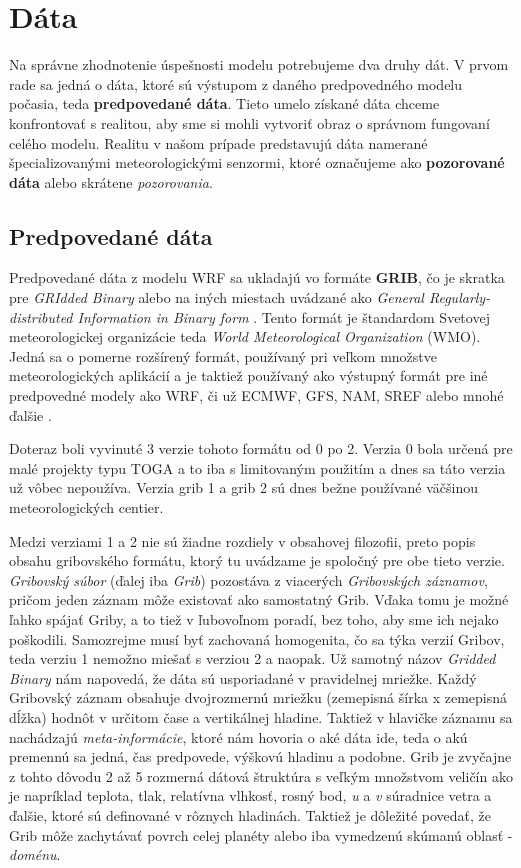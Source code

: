 \section{Dáta}
\label{sec:data}
Na správne zhodnotenie úspešnosti modelu potrebujeme dva druhy dát. V prvom rade sa jedná o dáta, ktoré sú výstupom z daného predpovedného modelu počasia, teda \textbf{predpovedané dáta}. Tieto umelo získané dáta chceme konfrontovať s realitou, aby sme si mohli vytvoriť obraz o správnom fungovaní celého modelu. Realitu v našom prípade predstavujú dáta namerané špecializovanými meteorologickými senzormi, ktoré označujeme ako \textbf{pozorované dáta} alebo skrátene \textit{pozorovania}.  

\subsection{Predpovedané dáta}
Predpovedané dáta z modelu WRF sa ukladajú vo formáte \textbf{GRIB}, čo je skratka pre \textit{GRIdded Binary} \cite{GRIB} alebo na iných miestach uvádzané ako \textit{General Regularly-distributed Information in Binary form} \cite{GRIB12}. Tento formát je štandardom Svetovej meteorologickej organizácie teda \textit{World Meteorological Organization} (WMO). Jedná sa o pomerne rozšírený formát, používaný pri veľkom množstve meteorologických aplikácií a je taktiež používaný ako výstupný formát pre iné predpovedné modely ako WRF, či už ECMWF, GFS, NAM, SREF alebo mnohé ďalšie \cite{Products}.

Doteraz boli vyvinuté 3 verzie tohoto formátu od 0 po 2. Verzia 0 bola určená pre malé projekty typu TOGA a to iba s limitovaným použitím a dnes sa táto verzia už vôbec nepoužíva. Verzia grib 1 \cite{GRIB} a grib 2 \cite{GRIB12} sú dnes bežne používané väčšinou meteorologických centier.

Medzi verziami 1 a 2 nie sú žiadne rozdiely v obsahovej filozofii, preto popis obsahu gribovského formátu, ktorý tu uvádzame je spoločný pre obe tieto verzie. 
\textit{Gribovský súbor} (ďalej iba \textit{Grib}) pozostáva z viacerých \textit{Gribovských záznamov}, pričom jeden záznam môže existovať ako samostatný Grib. Vďaka tomu je možné ľahko spájať Griby, a to tiež v ľubovoľnom poradí, bez toho, aby sme ich nejako poškodili. Samozrejme musí byť zachovaná homogenita, čo sa týka verzií Gribov, teda verziu 1 nemožno miešať s verziou 2 a naopak.
Už samotný názov \textit{Gridded Binary} nám napovedá, že dáta sú usporiadané v pravidelnej mriežke. Každý Gribovský záznam obsahuje dvojrozmernú mriežku (zemepisná šírka x zemepisná dĺžka) hodnôt v určitom čase a vertikálnej hladine. Taktiež v hlavičke záznamu sa nachádzajú \textit{meta-informácie}, ktoré nám hovoria o aké dáta ide, teda o akú premennú sa jedná, čas predpovede, výškovú hladinu a podobne. Grib je zvyčajne z tohto dôvodu 2 až 5 rozmerná dátová štruktúra s veľkým množstvom veličín ako je napríklad teplota, tlak, relatívna vlhkosť, rosný bod, \textit{u} a \textit{v} súradnice vetra a ďalšie, ktoré sú definované v rôznych hladinách. Taktiež je dôležité povedať, že Grib môže zachytávať povrch celej planéty alebo iba vymedzenú skúmanú oblasť - \textit{doménu}.

